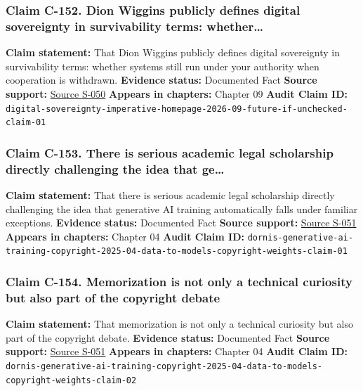 \documentclass[
  american,
  11pt,
  letterpaper,
]{article}
\begin{document}
\subsubsection{Claim C-152. Dion Wiggins publicly defines digital
sovereignty in survivability terms:
whether\ldots{}}\label{claim-c-152-dion-wiggins-publicly-defines-digital-sovereignty-in-survivability-terms-whether}

\textbf{Claim statement:} That Dion Wiggins publicly defines digital
sovereignty in survivability terms: whether systems still run under your
authority when cooperation is withdrawn. \textbf{Evidence status:}
Documented Fact \textbf{Source support:}
\hyperref[source-s-050-the-digital-sovereignty-imperative]{Source S-050}
\textbf{Appears in chapters:} Chapter 09 \textbf{Audit Claim ID:}
\texttt{digital-sovereignty-imperative-homepage-2026-09-future-if-unchecked-claim-01}

\subsubsection{Claim C-153. There is serious academic legal scholarship
directly challenging the idea that
ge\ldots{}}\label{claim-c-153-there-is-serious-academic-legal-scholarship-directly-challenging-the-idea-that-ge}

\textbf{Claim statement:} That there is serious academic legal
scholarship directly challenging the idea that generative AI training
automatically falls under familiar exceptions. \textbf{Evidence status:}
Documented Fact \textbf{Source support:}
\hyperref[source-s-051-generative-ai-training-and-copyright-law]{Source
S-051} \textbf{Appears in chapters:} Chapter 04 \textbf{Audit Claim ID:}
\texttt{dornis-generative-ai-training-copyright-2025-04-data-to-models-copyright-weights-claim-01}

\subsubsection{Claim C-154. Memorization is not only a technical
curiosity but also part of the copyright
debate}\label{claim-c-154-memorization-is-not-only-a-technical-curiosity-but-also-part-of-the-copyright-debate}

\textbf{Claim statement:} That memorization is not only a technical
curiosity but also part of the copyright debate. \textbf{Evidence
status:} Documented Fact \textbf{Source support:}
\hyperref[source-s-051-generative-ai-training-and-copyright-law]{Source
S-051} \textbf{Appears in chapters:} Chapter 04 \textbf{Audit Claim ID:}
\texttt{dornis-generative-ai-training-copyright-2025-04-data-to-models-copyright-weights-claim-02}
\end{document}
